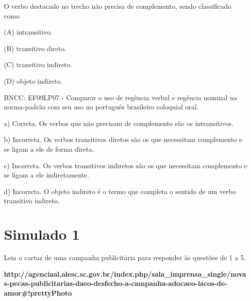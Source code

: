 \begin{itemize}
\begin{itemize}
O verbo destacado no trecho não precisa de complemento, sendo
classificado como

(A) intransitivo.

(B) transitivo direto.

(C) transitivo indireto.

(D) objeto indireto.

BNCC: EF09LP07 - Comparar o uso de regência verbal e regência nominal na
norma-padrão com seu uso no português brasileiro coloquial oral.

a) Correta. Os verbos que não precisam de complemento são os
intransitivos.

b) Incorreta. Os verbos transitivos diretos são os que necessitam
complemento e se ligam a ele de forma direta.

c) Incorreta. Os verbos transitivos indiretos são os que necessitam
complemento e se ligam a ele indiretamente.

d) Incorreta. O objeto indireto é o termo que completa o sentido de um
verbo transitivo indireto.

\chapter{Simulado 1}

Leia o cartaz de uma campanha publicitária para responder às questões de
1 a 5.

\textbf{http://agenciaal.alesc.sc.gov.br/index.php/sala\_imprensa\_single/novas-pecas-publicitarias-daeo-desfecho-a-campanha-adocaeo-lacos-de-amor\#!prettyPhoto}


\end{itemize}
\end{itemize}
